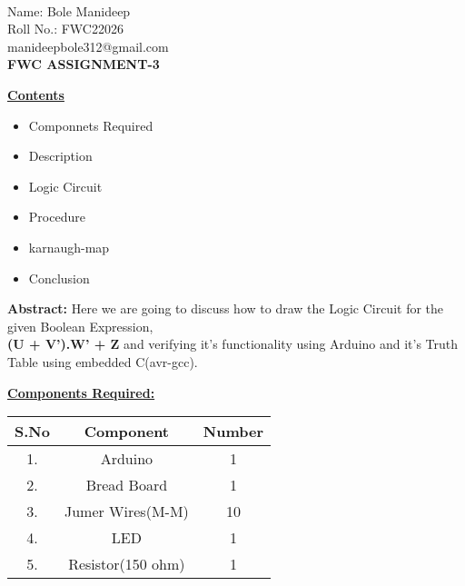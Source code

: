\documentclass[10pt,a4paper]{report}
\begin{document}
 \vspace{3mm}\\ \raggedleft Name: Bole Manideep\vspace{2mm}\\ \raggedleft Roll No.: FWC22026\vspace{2mm}\\ \raggedleft manideepbole312@gmail.com \vspace{10mm}
\\ \centering \Large \textbf{FWC ASSIGNMENT-3} \normalsize \vspace{15mm}
\begin{multicols}{2} \raggedright \large \textbf{\underline{Contents}} \normalsize \vspace{5mm}
\begin{itemize}
\raggedright  \item Componnets Required \item Description \item Logic Circuit \item Procedure \item karnaugh-map \item Conclusion
\end{itemize} \vspace{5mm}
\raggedright \hspace{10mm} \textbf{Abstract:}  Here we are going to discuss how to draw the Logic Circuit for the given Boolean Expression,\\  \textbf{(U + V').W' + Z} and verifying it's functionality using Arduino and it's Truth Table using embedded C(avr-gcc).\vspace{5mm} 
\\ \raggedright \large \textbf{\underline{Components Required:}} \normalsize \vspace{3mm}

\begin{center}
    \setlength{\arrayrulewidth}{0.1mm}
\setlength{\tabcolsep}{12pt}
\renewcommand{\arraystretch}{1.5}
    \begin{tabular}{|c|c|c|}
    \hline %
      \textbf{S.No} & \textbf{Component} & \textbf{Number}\\
      \hline
	1. & Arduino & 1 \\
	2. & Bread Board & 1 \\
	3. & Jumer Wires(M-M) & 10 \\
	4. & LED & 1 \\
	5. & Resistor(150 ohm) & 1 \\ 
      \hline
      

\end{tabular}
\end{center}
\end{multicols}
\end{document}
